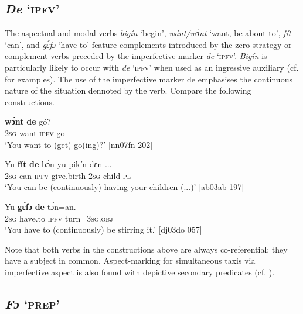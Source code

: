 \subsection{\textit{De} ‘\textsc{ipfv}’}\label{sec:10.5.3}

The aspectual and modal verbs \textit{bigín} ‘begin’, \textit{wánt/wɔ́nt} ‘want, be about to’, \textit{fít} ‘can’, and \textit{gɛ́fɔ} ‘have to’ feature complements introduced by the zero strategy or complement verbs preceded by the imperfective marker \textit{de} ‘\textsc{ipfv}’. \textit{Bigín} is particularly likely to occur with \textit{de} ‘\textsc{ipfv}’ when used as an ingressive auxiliary (cf.  for examples). The use of the imperfective marker de emphasises the continuous nature of the situation dennoted by the verb. Compare the following constructions.{\fff}


\ea%
    \label{ex:key:1381}
\gll
           \textbf{wɔ́nt}  \textbf{de} gó?\\
\textsc{2sg}  want  \textsc{ipfv}  go\\

\glt ‘You want to (get) go(ing)?’ [nn07fn 202]
\z


\ea%
    \label{ex:key:1382}
\gll
Yu  \textbf{fít}  \textbf{de} bɔ́n\textbf{}     yu  pikín  dɛn   \op...\cp{}\\
\textsc{2sg}  can  \textsc{ipfv}  give.birth  \textsc{2sg}  child  \textsc{pl}\\

\glt ‘You can be (continuously) having your children (...)’ [ab03ab 197]
\z


\ea%
    \label{ex:key:1383}
    \gll Yu  \textbf{gɛ́fɔ}    \textbf{de}  tɔ́n=an.\\
\textsc{2sg}  have.to  \textsc{ipfv}  turn=\textsc{3sg.obj}\\

\glt ‘You have to (continuously) be stirring it.’ [dj03do 057]
\z

\largerpage
Note that both verbs in the constructions above are always co-referential; they have a subject in common. Aspect-marking for simultaneous taxis via imperfective aspect is also found with depictive secondary predicates (cf. ).

\subsection{\textit{Fɔ} ‘\textsc{prep}’} 

